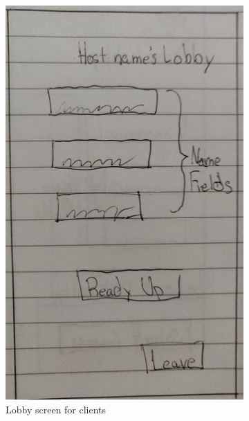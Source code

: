 \documentclass{dissertation}
\begin{document}
\begin{figure}[H]
\begin{subfigure}[h]{.5\textwidth}
\centering
\includegraphics[width = .8\linewidth]{images/paper-prototype3.jpeg}
\caption{Lobby screen for clients}
\label{fig:pp3}
\end{subfigure}
\begin{subfigure}[h]{.5\textwidth}
\centering

\end{subfigure}
\end{figure}
\end{document}
